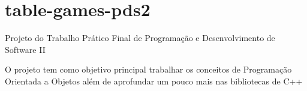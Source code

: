 \chapter{table-\/games-\/pds2}
\hypertarget{md_README}{}\label{md_README}
\label{md_README_autotoc_md0}%
%
 Projeto do Trabalho Prático Final de Programação e Desenvolvimento de Software II

O projeto tem como objetivo principal trabalhar os conceitos de Programação Orientada a Objetos além de aprofundar um pouco mais nas bibliotecas de C++ 